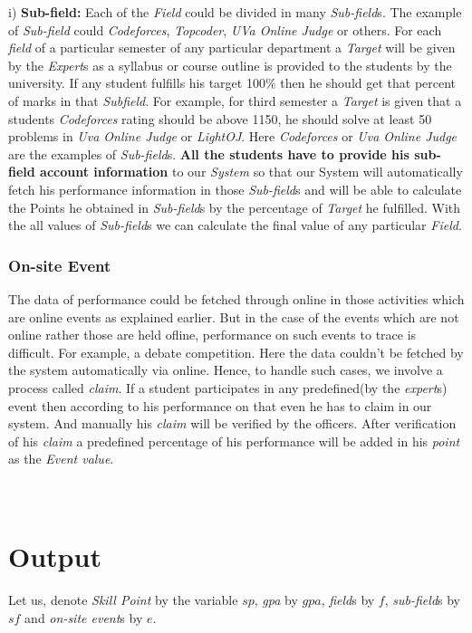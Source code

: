 \documentclass[conference]{IEEEtran}
\begin{document}
 i) \textbf{Sub-field:} Each of the \textit{Field} could be divided in many \textit{Sub-field}s. The example of \textit{Sub-field} could \textit{Codeforces}, \textit{Topcoder}, \textit{UVa Online Judge} or others. For each \textit{field} of a particular semester of any particular department a \textit{Target} will be given by the \textit{Expert}s as a syllabus or course outline is provided to the students by the university. If any student fulfills his target 100\% then he should get that percent of marks in that \textit{Subfield}. For example, for third semester a \textit{Target} is given that a students \textit{Codeforces} rating should be above 1150, he should solve at least 50 problems in \textit{Uva Online Judge} or \textit{LightOJ}. Here \textit{Codeforces} or \textit{Uva Online Judge} are the examples of \textit{Sub-field}s. \textbf{All the students have to provide his sub-field account information} to our \textit{System} so that our System will automatically fetch his performance information in those \textit{Sub-field}s and will be able to calculate the Points he obtained in \textit{Sub-field}s by the percentage of \textit{Target} he fulfilled. With the all values of \textit{Sub-field}s we can calculate the final value of any particular \textit{Field}.\\

 
\subsubsection{\textbf{On-site Event}}
The data of performance could be fetched through online in those activities which are online events as explained earlier. But in the case of the events which are not online rather those are held ofline, performance on such events to trace is difficult. For example, a debate competition. Here the data couldn't be fetched by the system automatically via online. Hence, to handle such cases, we involve a process called \textit{claim}. If a student participates in any predefined(by the \textit{expert}s) event then according to his performance on that even he has to claim in our system. And manually his \textit{claim} will be verified by the officers. After verification of his \textit{claim} a predefined percentage of his performance will be added in his \textit{point} as the \textit{Event value}.\\\\\\

\section{Output}
Let us, denote \textit{Skill Point} by the variable $sp$, \textit{gpa} by $gpa$, \textit{field}s by $f$, \textit{sub-field}s by $sf$ and \textit{on-site event}s by $e$.
\end{document}
